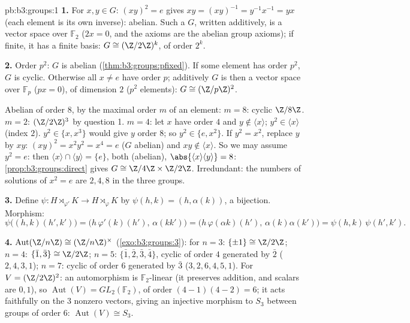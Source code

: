 \begin{solution}{pb:b3:groups:1}
\textbf{1.} For $x, y \in G$: $(xy)^2 = e$ gives $xy = (xy)^{-1} =
y^{-1}x^{-1} = yx$ (each element is its own inverse): abelian.
Such a $G$, written additively, is a vector space over $\mathbb
F_2$ ($2x = 0$, and the axioms are the abelian group axioms); if
finite, it has a finite basis: $G \cong (\Z/2\Z)^k$, of order
$2^k$.

\textbf{2.} Order $p^2$: $G$ is abelian
(\cref{thm:b3:groups:pfixed}). If some element has order $p^2$,
$G$ is cyclic. Otherwise all $x \neq e$ have order $p$; additively
$G$ is then a vector space over $\mathbb F_p$ ($px = 0$), of
dimension $2$ ($p^2$ elements): $G \cong (\Z/p\Z)^2$.

Abelian of order $8$, by the maximal order $m$ of an element: $m =
8$: cyclic $\Z/8\Z$. $m = 2$: $(\Z/2\Z)^3$ by question 1. $m = 4$:
let $x$ have order $4$ and $y \notin \langle x \rangle$; $y^2 \in
\langle x\rangle$ (index $2$). $y^2 \in \{x, x^3\}$ would give $y$
order $8$; so $y^2 \in \{e, x^2\}$. If $y^2 = x^2$, replace $y$ by
$xy$: $(xy)^2 = x^2y^2 = x^4 = e$ ($G$ abelian) and $xy \notin
\langle x\rangle$. So we may assume $y^2 = e$: then $\langle x
\rangle \cap \langle y \rangle = \{e\}$, both  (abelian),
$\abs{\langle x\rangle \langle y\rangle} = 8$:
\cref{prop:b3:groups:direct} gives $G \cong \Z/4\Z \times \Z/2\Z$.
Irredundant: the numbers of solutions of $x^2 = e$ are $2, 4, 8$
in the three groups.

\textbf{3.} Define $\psi \colon H \rtimes_{\varphi'} K \to H
\rtimes_{\varphi} K$ by $\psi(h, k) = (h, \alpha(k))$, a bijection.
Morphism:
\[
\psi\bigl((h,k)(h',k')\bigr)
= \bigl(h\,\varphi'(k)(h'),\, \alpha(kk')\bigr)
= \bigl(h\,\varphi(\alpha k)(h'),\, \alpha(k)\alpha(k')\bigr)
= \psi(h,k)\,\psi(h',k').
\]

\textbf{4.} $\operatorname{Aut}(\Z/n\Z) \cong (\Z/n\Z)^\times$
(\cref{exo:b3:groups:3}): for $n = 3$: $\{\pm 1\} \cong \Z/2\Z$;
$n = 4$: $\{\bar 1, \bar 3\} \cong \Z/2\Z$; $n = 5$: $\{\bar 1,
\bar 2, \bar 3, \bar 4\}$, cyclic of order $4$ generated by $\bar
2$ ($2, 4, 3, 1$); $n = 7$: cyclic of order $6$ generated by $\bar
3$ ($3, 2, 6, 4, 5, 1$). For $V = (\Z/2\Z)^2$: an automorphism is
$\mathbb F_2$-linear (it preserves addition, and scalars are $0,
1$), so $\operatorname{Aut}(V) = GL_2(\mathbb F_2)$, of order
$(4-1)(4-2) = 6$; it acts faithfully on the $3$ nonzero vectors,
giving an injective morphism to $S_3$ between groups of order
$6$: $\operatorname{Aut}(V) \cong S_3$.


\end{solution}
